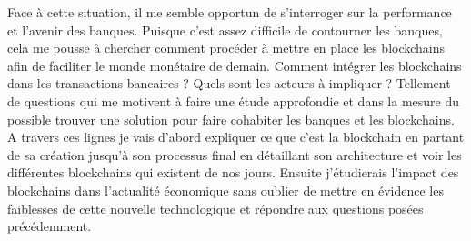 \documentclass[12pt]{report}
\begin{document}
\hspace{1cm} Face à cette situation, il me semble opportun de s'interroger sur la performance et l'avenir des banques. Puisque c'est assez difficile de contourner les banques, cela me pousse à chercher comment procéder à mettre en place les blockchains afin de faciliter le monde monétaire de demain. Comment intégrer les blockchains dans les transactions bancaires ? Quels sont les acteurs à impliquer ? Tellement de questions qui me motivent à faire une étude approfondie et dans la mesure du possible trouver une solution pour faire cohabiter les banques et les blockchains.\\

\hspace{1cm} A travers ces lignes je vais d'abord expliquer ce que c'est la blockchain en partant de sa création jusqu'à son processus final en détaillant son architecture et voir les différentes blockchains qui existent de nos jours. Ensuite j'étudierais l'impact des blockchains dans l'actualité économique sans oublier de mettre en évidence les faiblesses de cette nouvelle technologique et répondre aux questions posées précédemment.


\newpage
\end{document}
